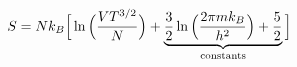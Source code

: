 

\vspace*{\fill}
\centering

\begin{align*}
    S = Nk_{B}\Big[ \ln{\Big( \frac{VT^{3/2}}{N} \Big)} + \underbrace{\frac{3}{2}\ln{\Big( \frac{2\pi m k_{B}}{h^2} \Big)} + \frac{5}{2}}_{\rm constants} \Big]
\end{align*}

\centering
\vspace*{\fill}

